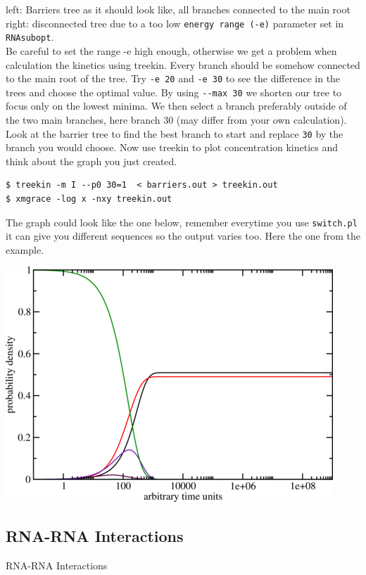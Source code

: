 \documentclass[]{article}
\begin{document}
left: Barriers tree as it should look like, all branches connected to
the main root right: disconnected tree due to a too low
\texttt{energy\ range\ (-e)} parameter set in \texttt{RNAsubopt}.\\
 Be careful to set the range -e high enough, otherwise we get a problem
when calculation the kinetics using treekin. Every branch should be
somehow connected to the main root of the tree. Try \texttt{-e\ 20} and
\texttt{-e\ 30} to see the difference in the trees and choose the optimal
value. By using \texttt{-\/-max\ 30} we shorten our tree to focus only
on the lowest minima. We then select a branch preferably outside of the
two main branches, here branch 30 (may differ from your own calculation).
Look at the barrier tree to find the best branch to start and replace
\texttt{30} by the branch you would choose. Now use treekin to plot
concentration kinetics and think about the graph you just created.

\begin{verbatim}
$ treekin -m I --p0 30=1  < barriers.out > treekin.out
$ xmgrace -log x -nxy treekin.out
\end{verbatim}

The graph could look like the one below, remember everytime you use
\texttt{switch.pl} it can give you different sequences so the output
varies too. Here the one from the example.

\includegraphics{Figs/switch_treekin.png}\\

\subsection{RNA-RNA Interactions}{RNA-RNA Interactions}\label{rna-rna-interactions}
\end{document}
